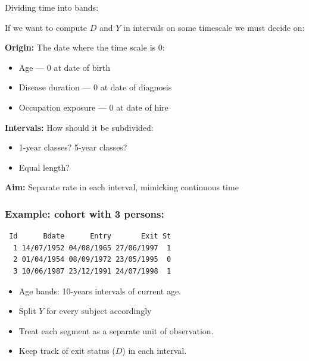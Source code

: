 \begin{frame}{Dividing time into bands:}

  If we want to compute $D$ and $Y$ in intervals on some timescale we
  must decide on:

\pause
\textbf{Origin:} The date where the time scale is $0$: \pause
  \begin{itemize}
  \item Age --- $0$ at date of birth
  \item Disease duration --- $0$ at date of diagnosis
  \item Occupation exposure --- $0$ at date of hire
  \end{itemize}

\pause
\textbf{Intervals:} How should it be subdivided:
 \begin{itemize}
  \item 1-year classes? 5-year classes?
  \item Equal length?
  \end{itemize}

\pause
\textbf{Aim:} Separate rate in each interval, mimicking continuous time

\end{frame}

\begin{frame}[fragile]
  \frametitle{Example: cohort with 3 persons:}
\small
\renewcommand{\baselinestretch}{0.9}
\begin{verbatim}
 Id      Bdate      Entry       Exit St
  1 14/07/1952 04/08/1965 27/06/1997  1
  2 01/04/1954 08/09/1972 23/05/1995  0
  3 10/06/1987 23/12/1991 24/07/1998  1
\end{verbatim}
\renewcommand{\baselinestretch}{1.0}
\normalsize
\pause
\vspace*{-1ex}
\begin{itemize}[<+->]
\item Age bands: 10-years intervals of current age.
\item Split $Y$ for every subject accordingly
\item Treat each segment as a separate unit of observation.
\item Keep track of exit status ($D$) in each interval.
\end{itemize}

\end{frame}

